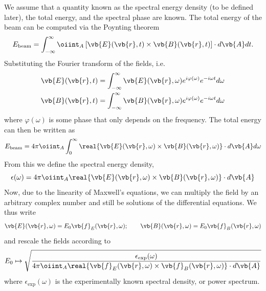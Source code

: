 \documentclass[11pt,SymmetricalJury]{inrsthesis/inrsthesis}
\begin{document}
We assume that a quantity known as the spectral energy density (to be defined later),
the total energy, and the spectral phase are known. The total energy of the
beam can be computed via the Poynting theorem
  \begin{equation}
    E_\text{beam}
      =
      \int_{-\infty}^\infty \oiint_A
        \left[\vb{E}(\vb{r},t)\times\vb{B}(\vb{r},t)\right]\cdot d\vb{A}dt.
  \end{equation}
Substituting the Fourier transform of the fields, i.e.
  \begin{align}
    \vb{E}(\vb{r},t) &=
      \int_{-\infty}^\infty
        \vb{E}(\vb{r},\omega)e^{i\varphi(\omega)}e^{-i\omega t} d\omega \\
    \vb{B}(\vb{r},t) &=
      \int_{-\infty}^\infty
        \vb{B}(\vb{r},\omega)e^{i\varphi(\omega)}e^{-i\omega t} d\omega
  \end{align}
where $\varphi(\omega)$ is some phase that only depends on the frequency.
The total energy can then be written as
  \begin{equation}
    E_\text{beam} = 4\pi \oiint_A \int_0^\infty
        \real{\vb{E}(\vb{r},\omega)\times\vb{B}(\vb{r},\omega)}\cdot d\vb{A}d\omega
  \end{equation}
From this we define the spectral energy density,
  \begin{equation}
    \epsilon(\omega)
      = 4\pi\oiint_A \real{\vb{E}(\vb{r},\omega)\times\vb{B}(\vb{r},\omega)}\cdot d\vb{A}
  \end{equation}
Now, due to the linearity of Maxwell's equations, we can multiply the field
by an arbitrary complex number and still be solutions of the differential
equations. We thus write
  \begin{equation}
    \vb{E}(\vb{r},\omega) = E_0\vb{f}_E(\vb{r},\omega); \qquad
    \vb{B}(\vb{r},\omega) = E_0\vb{f}_B(\vb{r},\omega)
  \end{equation}
and rescale the fields according to
  \begin{equation}
    E_0 \mapsto \sqrt{%
      \frac{\epsilon_\text{exp}(\omega)}
           {4\pi\oiint_A\real{\vb{f}_E(\vb{r},\omega)\times\vb{f}_B(\vb{r},\omega)}\cdot d\vb{A}}
    }
    \label{eq:sc.normalization}
  \end{equation}
where $\epsilon_\text{exp}(\omega)$ is the experimentally known spectral density,
or power spectrum.

\end{document}
